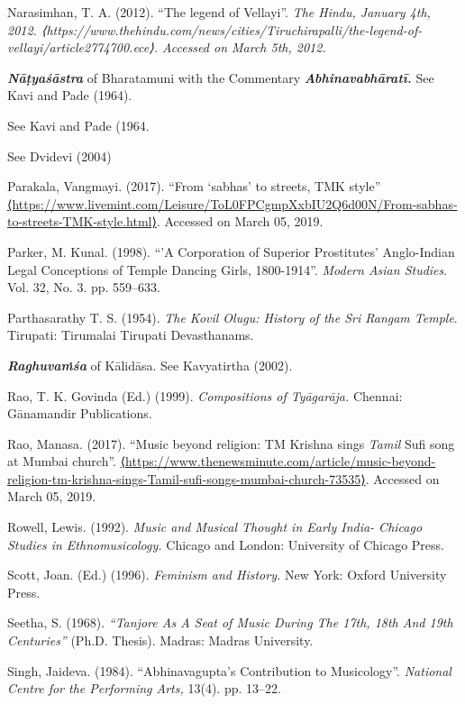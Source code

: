 \begin{thebibliography}{99}
  Narasimhan, T. A. (2012). ``The legend of Vellayi''. \textit{The Hindu, January 4th, 2012. ⟨https://www.thehindu.com/news/cities/Tiruchirapalli/the-legend-of-vellayi/article2774700.ece⟩. Accessed on March 5th, 2012.}

  \textbf{\textit{Nāṭyaśāstra}} of Bharatamuni with the Commentary \textbf{\textit{Abhinavabhāratī.}} See Kavi and Pade (1964).

 See Kavi and Pade (1964.

 See Dvidevi (2004)

  Parakala, Vangmayi. (2017). “From ‘sabhas’ to streets, TMK style” \url{⟨https://www.livemint.com/Leisure/ToL0FPCgmpXxbIU2Q6d00N/From-sabhas-to-streets-TMK-style.html⟩}. Accessed on March 05, 2019.

  Parker, M. Kunal. (1998). “'A Corporation of Superior Prostitutes' Anglo-Indian Legal Conceptions of Temple Dancing Girls, 1800-1914”. \textit{Modern Asian Studies}. Vol. 32, No. 3. pp. 559--633.

  Parthasarathy T. S. (1954). \textit{The Kovil Olugu: History of the Sri Rangam Temple}. Tirupati: Tirumalai Tirupati Devasthanams.

  \textit{\textbf{Raghuvaṁśa}} of Kālidāsa. See Kavyatirtha (2002).

  Rao, T. K. Govinda (Ed.) (1999). \textit{Compositions of Tyāgarāja. }Chennai: Gānamandir Publications.

  Rao, Manasa. (2017). “Music beyond religion: TM Krishna sings \textit{Tamil} Sufi song at Mumbai church”. \url{⟨https://www.thenewsminute.com/article/music-beyond-religion-tm-krishna-sings-Tamil-sufi-songs-mumbai-church-73535⟩}. Accessed on March 05, 2019.

  Rowell, Lewis. (1992). \textit{Music and Musical Thought in Early India- Chicago Studies in Ethnomusicology.} Chicago and London: University of Chicago Press.

  Scott, Joan. (Ed.) (1996).\textit{ Feminism and History. }New York: Oxford University Press.

  Seetha, S. (1968). \textit{“Tanjore As A Seat of Music During The 17th, 18th And 19th Centuries” }(Ph.D. Thesis). Madras: Madras University.

  Singh, Jaideva. (1984). “Abhinavagupta's Contribution to Musicology”. \textit{National Centre for the Performing Arts, }13(4). pp. 13--22.


\end{thebibliography}
